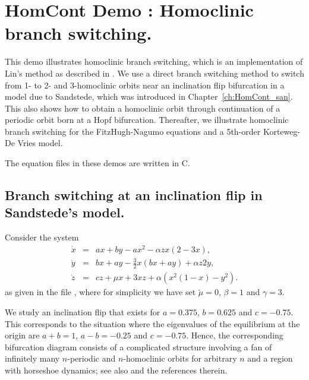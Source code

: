 \documentclass[12pt]{report}
\begin{document}
\chapter{ {\cal HomCont} Demo : Homoclinic branch switching.} \label{ch:HomCont_hbs}


This demo illustrates homoclinic branch switching, which is an
implementation of Lin's method \cite{Li:90,Sa:93,Ye:01}
as described in . We use a
direct branch switching method to switch from 1- to 2- and
3-homoclinic orbits near an inclination flip bifurcation 
in a model due to Sandstede, 
which was introduced in Chapter~\ref{ch:HomCont_san}.
This also shows how to obtain a homoclinic orbit through continuation
of a periodic orbit born at a Hopf bifurcation.
Thereafter, we illustrate homoclinic branch switching for the
FitzHugh-Nagumo equations and a 5th-order Korteweg-De Vries model.

The equation files in these demos are written in C.

\section{ Branch switching at an inclination flip in Sand\-stede's
  model.}
\label{sec:HomCont_hbs_san}
Consider the system \cite{Sa:95b}
\begin{equation} \begin{array}{rcl}
\dot{x} & = & a x + b y - a x^2 - \alpha z x (2-3x), \\
\dot{y} & = & b x + a y - \frac{3}{2} x (b x + a y) + \alpha z 2 y, \\
\dot{z} & = & c z + \mu x + 3 x z + \alpha (x^2 (1-x) - y^2).
\end{array} \end{equation}
as given in the file , where for simplicity we have
set $\tilde\mu=0$, $\beta=1$ and $\gamma=3$.

We study an inclination flip that exists for $a=0.375$,
$b=0.625$ and $c=-0.75$. This corresponds to the situation
where the eigenvalues of the equilibrium at the origin are
$a+b=1$, $a-b=-0.25$ and $c=-0.75$. Hence, the corresponding
bifurcation diagram consists of a complicated structure involving a
fan of infinitely many $n$-periodic and $n$-homoclinic orbits
for arbitrary $n$ and a region with horseshoe dynamics; see
also  and the references therein.
\end{document}
